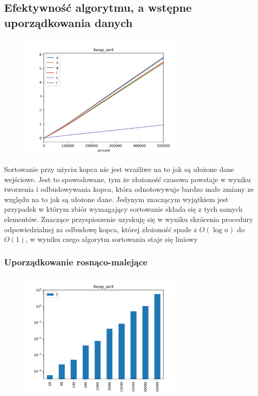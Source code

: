\documentclass[]{article}
\begin{document}
	\subsection{Efektywność algorytmu, a wstępne uporządkowania danych}
		\begin{figure}[H]
			\centering
			\includegraphics[width=8cm]{heap_sort_gather.png}	
		\end{figure}
	Sortowanie przy użyciu kopca nie jest wrażliwe na to jak są ułożone dane wejściowe. Jest to spowodowane, tym że złożoność czasowa powstaje w wyniku tworzenia i odbudowywania kopca, która odnotowywuje bardzo małe zmiany ze względu na to jak są ułożone dane. Jedynym znaczącym wyjątkiem jest przypadek w którym zbiór wymagający sortowanie składa się z tych samych elementów. Znaczące przyspieszenie uzyskuję się w wyniku skrócenia procedury odpowiedzialnej za odbudowę kopca, której złożoność spade z $ O(\log{n}) $ do $ O(1) $, w wyniku czego algorytm sortowania staje się liniowy
		\subsubsection{Uporządkowanie rosnąco-malejące}
		\begin{figure}[H]
			\centering
			\includegraphics[width=8cm]{heap_sort_a.png}	
		\end{figure}
\end{document}
